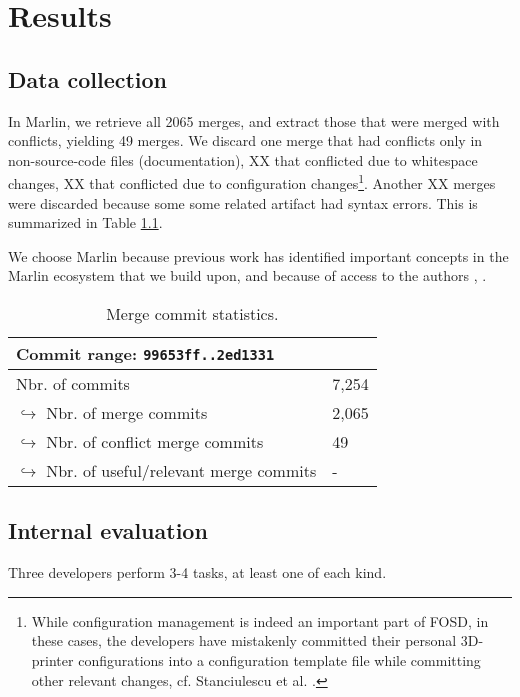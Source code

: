 \chapter{Results}

\section{Data collection}

In Marlin, we retrieve all 2065 merges, and extract those that were merged with conflicts, yielding 49 merges. We discard one merge that had conflicts only in non-source-code files (documentation), XX that conflicted due to whitespace changes, XX that conflicted due to configuration changes\footnote{While configuration management is indeed an important part of FOSD, in these cases, the developers have mistakenly committed their personal 3D-printer configurations into a configuration template file while committing other relevant changes, cf. Stanciulescu et al. \cite{stanciulescu2015}.}. Another XX merges were discarded because some some related artifact had syntax errors. This is summarized in Table \ref{tab:marlinmerge}.

We choose Marlin because previous work has identified important concepts in the Marlin ecosystem that we build upon, and because of access to the authors \cite{stanciulescu2015}, \cite{stanciulescu2016concepts}.

\begin{table}[h]
    \centering
    \caption{Merge commit statistics.}
    \label{tab:marlinmerge}
    \begin{tabular}{l l}
    \hline\hline
        Commit range: \texttt{99653ff..2ed1331}& \\\hline
        Nbr. of commits & 7,254\\
        $\hookrightarrow$ Nbr. of merge commits & 2,065 \\
        \hspace{1em}$\hookrightarrow$ Nbr. of conflict merge commits & 49 \\
        \hspace{2em}$\hookrightarrow$ Nbr. of useful/relevant merge commits & - \\
    \hline\hline
    \end{tabular}
\end{table}


\section{Internal evaluation}
Three developers perform 3-4 tasks, at least one of each kind.

